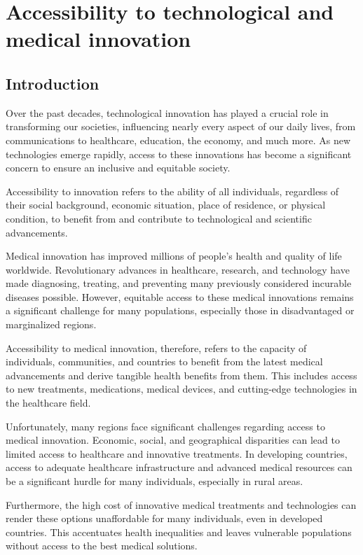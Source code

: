 \chapter{Accessibility to technological and medical innovation}
\section{Introduction}
Over the past decades, technological innovation has played a crucial role in transforming our societies, influencing nearly every aspect of our daily lives, from communications to healthcare, education, the economy, and much more. As new technologies emerge rapidly, access to these innovations has become a significant concern to ensure an inclusive and equitable society.

Accessibility to innovation refers to the ability of all individuals, regardless of their social background, economic situation, place of residence, or physical condition, to benefit from and contribute to technological and scientific advancements.

Medical innovation has improved millions of people's health and quality of life worldwide. Revolutionary advances in healthcare, research, and technology have made diagnosing, treating, and preventing many previously considered incurable diseases possible. However, equitable access to these medical innovations remains a significant challenge for many populations, especially those in disadvantaged or marginalized regions.

Accessibility to medical innovation, therefore, refers to the capacity of individuals, communities, and countries to benefit from the latest medical advancements and derive tangible health benefits from them. This includes access to new treatments, medications, medical devices, and cutting-edge technologies in the healthcare field.

Unfortunately, many regions face significant challenges regarding access to medical innovation. Economic, social, and geographical disparities can lead to limited access to healthcare and innovative treatments. In developing countries, access to adequate healthcare infrastructure and advanced medical resources can be a significant hurdle for many individuals, especially in rural areas.

Furthermore, the high cost of innovative medical treatments and technologies can render these options unaffordable for many individuals, even in developed countries. This accentuates health inequalities and leaves vulnerable populations without access to the best medical solutions.


